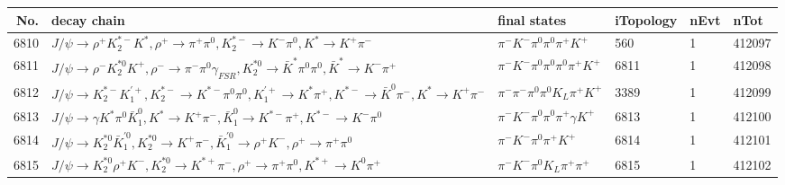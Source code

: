 \begin{table}[htbp] 
\begin{center}
\begin{small}
\begin{tabular}{rlllll}\hline\hline
 No. & decay chain & final states &  iTopology & nEvt & nTot \\\hline
6810&$J/\psi       \rightarrow \rho^{+}      K_2^{*-}       K^{*}          , \rho^{+}       \rightarrow \pi^{+}        \pi^{0}        , K_2^{*-}        \rightarrow K^{-}          \pi^{0}        , K^{*}           \rightarrow K^{+}          \pi^{-}        $&$\pi^{-}        K^{-}          \pi^{0}        \pi^{0}        \pi^{+}        K^{+}          $&  560&    1&412097\\
6811&$J/\psi       \rightarrow \rho^{-}      K_2^{*0}       K^{+}          , \rho^{-}       \rightarrow \pi^{-}        \pi^{0}        \gamma_{FSR} , K_2^{*0}        \rightarrow \bar{K}^{*}   \pi^{0}        \pi^{0}        , \bar{K}^{*}    \rightarrow K^{-}          \pi^{+}        $&$\pi^{-}        K^{-}          \pi^{0}        \pi^{0}        \pi^{0}        \pi^{+}        K^{+}          $& 6811&    1&412098\\
6812&$J/\psi       \rightarrow K_2^{*-}       K_1^{'+}      , K_2^{*-}        \rightarrow K^{*-}         \pi^{0}        \pi^{0}        , K_1^{'+}       \rightarrow K^{*}          \pi^{+}        , K^{*-}          \rightarrow \bar{K}^{0}   \pi^{-}        , K^{*}           \rightarrow K^{+}          \pi^{-}        $&$\pi^{-}        \pi^{-}        \pi^{0}        \pi^{0}        K_{L}          \pi^{+}        K^{+}          $& 3389&    1&412099\\
6813&$J/\psi       \rightarrow \gamma       K^{*}          \pi^{0}        \bar{K}_1^{0} , K^{*}           \rightarrow K^{+}          \pi^{-}        , \bar{K}_1^{0}  \rightarrow K^{*-}         \pi^{+}        , K^{*-}          \rightarrow K^{-}          \pi^{0}        $&$\pi^{-}        K^{-}          \pi^{0}        \pi^{0}        \pi^{+}        \gamma       K^{+}          $& 6813&    1&412100\\
6814&$J/\psi       \rightarrow K_2^{*0}       \bar{K}_1^{'0}, K_2^{*0}        \rightarrow K^{+}          \pi^{-}        , \bar{K}_1^{'0} \rightarrow \rho^{+}      K^{-}          , \rho^{+}       \rightarrow \pi^{+}        \pi^{0}        $&$\pi^{-}        K^{-}          \pi^{0}        \pi^{+}        K^{+}          $& 6814&    1&412101\\
6815&$J/\psi       \rightarrow K_2^{*0}       \rho^{+}      K^{-}          , K_2^{*0}        \rightarrow K^{*+}         \pi^{-}        , \rho^{+}       \rightarrow \pi^{+}        \pi^{0}        , K^{*+}          \rightarrow K^{0}          \pi^{+}        $&$\pi^{-}        K^{-}          \pi^{0}        K_{L}          \pi^{+}        \pi^{+}        $& 6815&    1&412102\\

\end{tabular}
\end{small}
\end{center}
\end{table}
